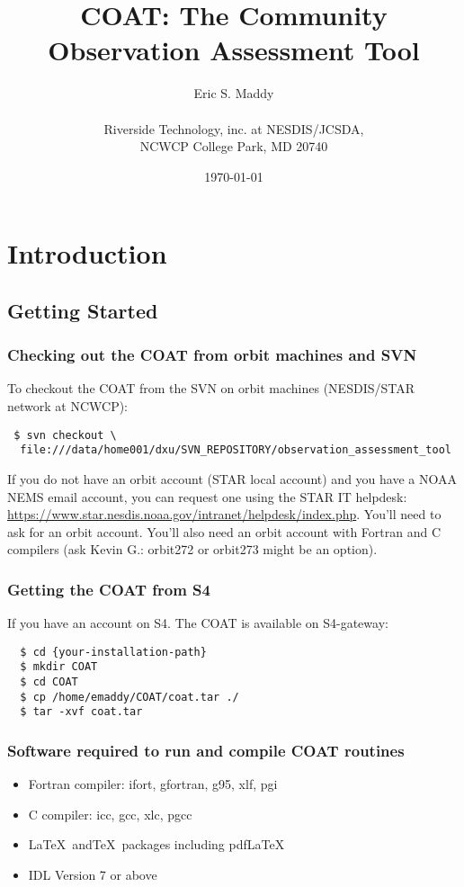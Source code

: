 \documentclass[10pt]{report}
\author{Eric S. Maddy \\ 
\\\vspace{6pt} Riverside Technology, inc. at NESDIS/JCSDA, \\ NCWCP College Park, MD 20740} \title{{COAT}: The Community Observation Assessment Tool} \date{\today}
\begin{document}
\maketitle
{}
\tableofcontents
\newpage
{}
\chapter{Introduction}
\section{Getting Started}
\subsection{Checking out the COAT from orbit machines and SVN}
To checkout the COAT from the SVN on orbit machines (NESDIS/STAR network at NCWCP): 
\begin{verbatim} 
 $ svn checkout \
  file:///data/home001/dxu/SVN_REPOSITORY/observation_assessment_tool
\end{verbatim}
If you do not have an orbit account (STAR local account) and you have a NOAA NEMS email account, you can request one using the STAR IT helpdesk:
  \url{https://www.star.nesdis.noaa.gov/intranet/helpdesk/index.php}.
You'll need to ask for an orbit account. You'll also need an orbit account with Fortran and C compilers (ask Kevin G.: orbit272 or orbit273 might be an option).

\subsection{Getting the COAT from S4}
If you have an account on S4.  The COAT is available on S4-gateway: 
\begin{verbatim}
  $ cd {your-installation-path}
  $ mkdir COAT
  $ cd COAT
  $ cp /home/emaddy/COAT/coat.tar ./
  $ tar -xvf coat.tar
\end{verbatim}
\subsection{Software required to run and compile COAT routines}
\begin{itemize}
  \item Fortran compiler: ifort, gfortran, g95, xlf, pgi
  \item C compiler: icc, gcc, xlc, pgcc 
  \item \LaTeX~and\TeX~packages including pdf\LaTeX
  \item IDL Version 7 or above
\end{itemize}
\newpage
\end{document}
